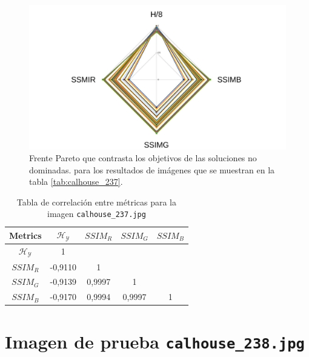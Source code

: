     \begin{figure}[H]
    \centering
    \includegraphics[width=\textwidth]{./Figures/calhouse_237/calhouse_237_2.jpg}
    \caption{Frente Pareto que contrasta los objetivos de las soluciones no dominadas. para los resultados de imágenes que se muestran en la tabla \ref{tab:calhouse_237}.}
    \label{fig:calhouse2372fp}
    \end{figure}

\begin{table}[H]
\setlength{\abovecaptionskip}{2pt plus 3pt minus 2pt} %
\caption[Parámetros de entrada para $MOPSO$]{Tabla de correlación entre métricas para la imagen \texttt{calhouse\_237.jpg}}
\begin{center}
 \begin{tabular}{||c | c c c c||} 
 \hline
Metrics & $\mathscr{H_Y}$ & $SSIM_R$ & $SSIM_G$ & $SSIM_B$ \\ 
\hline
$\mathscr{H_Y}$ & 1 &  &  & \\ 
\hline
$SSIM_R$ & -0,9110 & 1 &  \\ 
\hline
$SSIM_G$ & -0,9139 & 0,9997  & 1  & \\ 
\hline
$SSIM_B$ & -0,9170 & 0,9994  & 0,9997  & 1 \\ 
\hline
\end{tabular}
\end{center}
\label{table:correlacion}
\end{table}

\section{Imagen de prueba \texttt{calhouse\_238.jpg}}

